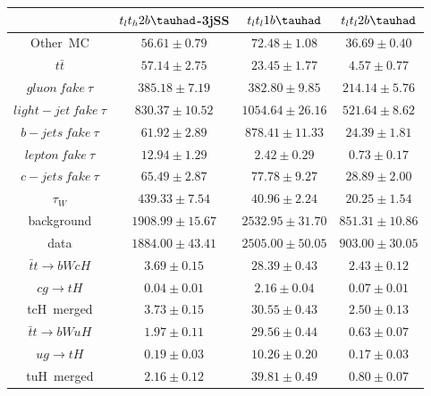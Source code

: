 \begin{tabular}{|c|c|c|c|} \hline
 & $t_{l}t_{h}2b\tauhad$-3jSS & $t_{l}t_{l}1b\tauhad$ & $t_{l}t_{l}2b\tauhad$\\\hline
Other~MC & $56.61\pm0.79$ & $72.48\pm1.08$ & $36.69\pm0.40$\\\hline
$t\bar{t}$ & $57.14\pm2.75$ & $23.45\pm1.77$ & $4.57\pm0.77$\\\hline
$gluon~fake~\tau$ & $385.18\pm7.19$ & $382.80\pm9.85$ & $214.14\pm5.76$\\\hline
$light-jet~fake~\tau$ & $830.37\pm10.52$ & $1054.64\pm26.16$ & $521.64\pm8.62$\\\hline
$b-jets~fake~\tau$ & $61.92\pm2.89$ & $878.41\pm11.33$ & $24.39\pm1.81$\\\hline
$lepton~fake~\tau$ & $12.94\pm1.29$ & $2.42\pm0.29$ & $0.73\pm0.17$\\\hline
$c-jets~fake~\tau$ & $65.49\pm2.87$ & $77.78\pm9.27$ & $28.89\pm2.00$\\\hline
$\tau_{W}$ & $439.33\pm7.54$ & $40.96\pm2.24$ & $20.25\pm1.54$\\\hline
background & $1908.99\pm15.67$ & $2532.95\pm31.70$ & $851.31\pm10.86$\\\hline
data & $1884.00\pm43.41$ & $2505.00\pm50.05$ & $903.00\pm30.05$\\\hline
$\bar{t}t\to bWcH$ & $3.69\pm0.15$ & $28.39\pm0.43$ & $2.43\pm0.12$\\\hline
$cg\to tH$ & $0.04\pm0.01$ & $2.16\pm0.04$ & $0.07\pm0.01$\\\hline
tcH~merged & $3.73\pm0.15$ & $30.55\pm0.43$ & $2.50\pm0.13$\\\hline
$\bar{t}t\to bWuH$ & $1.97\pm0.11$ & $29.56\pm0.44$ & $0.63\pm0.07$\\\hline
$ug\to tH$ & $0.19\pm0.03$ & $10.26\pm0.20$ & $0.17\pm0.03$\\\hline
tuH~merged & $2.16\pm0.12$ & $39.81\pm0.49$ & $0.80\pm0.07$\\\hline
\end{tabular}

